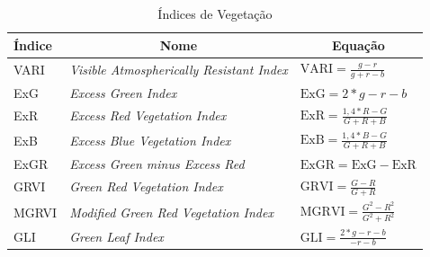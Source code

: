 \documentclass[12pt, a4paper, english, brazil]{article}
\begin{document}
\begin{table}[] %
    \centering
    \caption{Índices de Vegetação \cite{Lu_Zhou_2019}}
    \label{tab:iv}
    \begin{tabular}{@{}lll@{}}
        \toprule
        Índice & \multicolumn{1}{c}{Nome} & \multicolumn{1}{c}{Equação} \\ \midrule

        \multirow{2}{*}{VARI} & \multirow{2}{*}{\textit{Visible Atmospherically Resistant Index}} & \multirow{2}{*}{$\displaystyle \text{VARI} = \frac{g - r}{g + r - b} $} \\
        & & \\ \midrule

        \multirow{2}{*}{ExG} & \multirow{2}{*}{\textit{Excess Green Index}} & \multirow{2}{*}{$\displaystyle \text{ExG} = 2 * g - r - b$} \\
        & & \\ \midrule

        \multirow{2}{*}{ExR} & \multirow{2}{*}{\textit{Excess Red Vegetation Index}} & \multirow{2}{*}{$\displaystyle \text{ExR} = \frac{1,4 * R - G}{G + R + B} $ } \\
        & & \\ \midrule

        \multirow{2}{*}{ExB} & \multirow{2}{*}{\textit{Excess Blue Vegetation Index}} & \multirow{2}{*}{$\displaystyle \text{ExB} = \frac{1,4 * B - G}{G + R + B}$} \\
        & & \\ \midrule

        \multirow{2}{*}{ExGR} & \multirow{2}{*}{\textit{Excess Green minus Excess Red}} & \multirow{2}{*}{$\displaystyle \text{ExGR} = \text{ExG} - \text{ExR}$} \\
        & & \\ \midrule

        \multirow{2}{*}{GRVI} & \multirow{2}{*}{\textit{Green Red Vegetation Index}} & \multirow{2}{*}{$\displaystyle \text{GRVI} = \frac{G - R}{G + R}$} \\
        & & \\ \midrule

        \multirow{2}{*}{MGRVI} & \multirow{2}{*}{\textit{Modified Green Red Vegetation Index}} & \multirow{2}{*}{$\displaystyle \text{MGRVI} = \frac{G^2 - R^2}{G^2 + R^2}$} \\
        & & \\ \midrule

        \multirow{2}{*}{GLI} & \multirow{2}{*}{\textit{Green Leaf Index}} & \multirow{2}{*}{$\displaystyle \text{GLI} = \frac{2 * g - r - b}{-r - b}$} \\
        & & \\ \midrule


\end{tabular}
\end{table}
\end{document}
